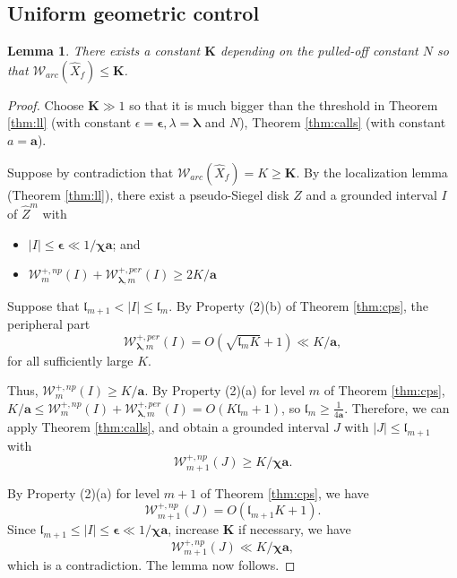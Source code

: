 \documentclass[11pt, reqno]{amsart}
\numberwithin{equation}{section}
\theoremstyle{plain}
\theoremstyle{theorem}
\newtheorem{lem}[theorem]{Lemma}
\theoremstyle{plain}
\theoremstyle{definition}
\numberwithin{figure}{section}
\newcommand{\length}{{\mathfrak l}}
\begin{document}
\subsection{Uniform geometric control}\label{subsec:ugc}
\begin{lem}\label{lem:tb}
There exists a constant $\mathbf{K}$ depending on the pulled-off constant $N$ so that $\mathcal{W}_{arc}(\widehat X_f)\leq \mathbf{K}$.
\end{lem}
\begin{proof}
Choose $\mathbf{K} \gg 1$ so that it is much bigger than the threshold in Theorem \ref{thm:ll} (with constant $\epsilon=\boldsymbol{\epsilon}, \lambda=\boldsymbol{\lambda}$ and $N$), Theorem \ref{thm:calls} (with constant $a= \mathbf{a}$).

Suppose by contradiction that $\mathcal{W}_{arc}(\widehat X_f) = K \geq \mathbf{K}$.
By the localization lemma (Theorem \ref{thm:ll}), there exist a pseudo-Siegel disk $\widehat Z$ and a grounded interval $I$ of $\widehat Z^m$ with 
\begin{itemize}
\item $\vert I \vert \leq \boldsymbol{\epsilon} \ll 1/\boldsymbol{\chi}\mathbf{a}$; and
\item $\mathcal{W}_m^{+, np}(I) +\mathcal{W}_{\boldsymbol{\lambda},m }^{+, per}(I)  \geq 2K/\mathbf{a}$
\end{itemize}
Suppose that $\mathfrak{l}_{m+1} < \vert I \vert \leq \mathfrak{l}_m$.
By Property (2)(b) of Theorem \ref{thm:cps}, the peripheral part 
$$
\mathcal{W}_{\boldsymbol{\lambda}, m}^{+, per}(I) = O(\sqrt{\length_{m} K} + 1) \ll K/\mathbf{a},
$$
for all sufficiently large $K$.

Thus, $\mathcal{W}_{m}^{+, np}(I) \geq K/\mathbf{a}$.
 By Property (2)(a) for level $m$ of Theorem \ref{thm:cps}, $K/\mathbf{a}\leq \mathcal{W}^{+, np}_{m}(I) +\mathcal{W}_{\boldsymbol{\lambda}, m}^{+, per}(I) = O(K\mathfrak{l}_m + 1)$, so $\mathfrak{l}_m \geq \frac{1}{4\mathbf{a}}$.
Therefore, we can apply Theorem \ref{thm:calls}, and obtain a grounded interval $J$ with $\vert J \vert \leq \length_{m+1}$ with 
$$
\mathcal{W}_{m+1}^{+, np}(J)\geq K/\boldsymbol{\chi}\mathbf{a}.
$$

By Property (2)(a) for level $m+1$ of Theorem \ref{thm:cps}, we have
$$
\mathcal{W}^{+, np}_{m+1}(J) = O(\length_{m+1}K + 1).
$$
Since $\mathfrak{l}_{m+1} \leq \vert I \vert \leq \boldsymbol{\epsilon} \ll 1/\boldsymbol{\chi}\mathbf{a}$, increase $\mathbf{K}$ if necessary, we have
$$
\mathcal{W}^{+, np}_{m+1}(J) \ll K/\boldsymbol{\chi}\mathbf{a},
$$
which is a contradiction.
The lemma now follows.
\end{proof}
\end{document}
